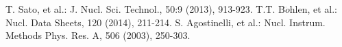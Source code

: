 \documentclass[a4paper, 10pt, twocolumn]{article}
\begin{document}
\begin{thebibliography}{10}
	 T. Sato, et al.: J. Nucl. Sci. Technol., 50:9 (2013), 913-923.
	 T.T. B$\ddot{o}$hlen, et al.: Nucl. Data Sheets, 120 (2014), 211-214.
	 S. Agostinelli, et al.: Nucl. Instrum. Methods Phys. Res. A, 506 (2003), 250-303.
\end{thebibliography}
\end{document}
